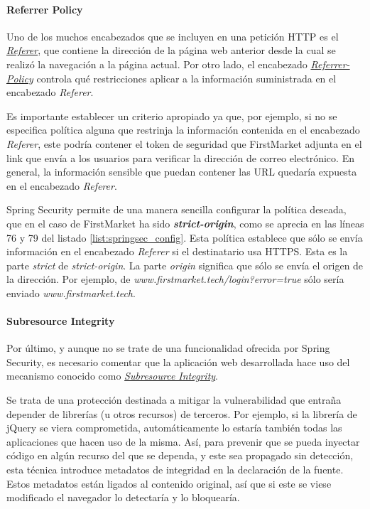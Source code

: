 \documentclass[a4paper]{article}
\begin{document}
	\paragraph{Referrer  Policy}
	Uno de los muchos encabezados que se incluyen en una petición HTTP es el \href{https://developer.mozilla.org/en-US/docs/Web/HTTP/Headers/Referer}{\emph{Referer}}, que contiene la dirección de la página web anterior desde la cual se realizó la navegación a la página actual. Por otro lado, el encabezado \href{https://developer.mozilla.org/en-US/docs/Web/HTTP/Headers/Referrer-Policy}{\emph{Referrer-Policy}} controla qué restricciones aplicar a la información suministrada en el encabezado \emph{Referer}.
	
	Es importante establecer un criterio apropiado ya que, por ejemplo, si no se especifica política alguna que restrinja la información contenida en el encabezado \emph{Referer}, este podría contener el token de seguridad que FirstMarket adjunta en el link que envía a los usuarios para verificar la dirección de correo electrónico. En general, la información sensible que puedan contener las URL quedaría expuesta en el encabezado \emph{Referer}.
	
	Spring Security permite de una manera sencilla configurar la política deseada, que en el caso de FirstMarket ha sido \textbf{\emph{strict-origin}}, como se aprecia en las líneas 76 y 79 del listado \ref{list:springsec_config}. Esta política establece que sólo se envía información en el encabezado \emph{Referer} si el destinatario usa HTTPS. Esta es la parte \emph{strict} de \emph{strict-origin}. La parte \emph{origin} significa que sólo se envía el origen de la dirección. Por ejemplo, de \emph{www.firstmarket.tech/login?error=true} sólo sería enviado \emph{www.firstmarket.tech}.
	
	\paragraph{Subresource Integrity}
	Por último, y aunque no se trate de una funcionalidad ofrecida por Spring Security, es necesario comentar que la aplicación web desarrollada hace uso del mecanismo conocido como \href{https://www.w3.org/TR/SRI/}{\emph{Subresource Integrity}}. 
	
	Se trata de una protección destinada a mitigar la vulnerabilidad que entraña depender de librerías (u otros recursos) de terceros. Por ejemplo, si la librería de jQuery se viera comprometida, automáticamente lo estaría también todas las aplicaciones que hacen uso de la misma. Así, para prevenir que se pueda inyectar código en algún recurso del que se dependa, y este sea propagado sin detección, esta técnica introduce metadatos de integridad en la declaración de la fuente. Estos metadatos están ligados al contenido original, así que si este se viese modificado el navegador lo detectaría y lo bloquearía.
	
\end{document}
